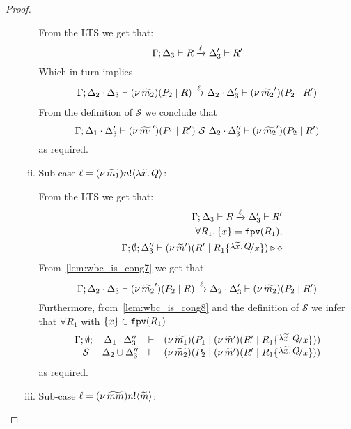 \begin{proof}
\begin{enumerate}
\begin{enumerate}[i.]
							\noi From the LTS we get that:
							\[
								\Gamma; \Delta_3 \vdash R \xrightarrow{\ell} \Delta_3' \vdash R'
							\]
							\noi Which in turn implies
							\begin{eqnarray*}
								\Gamma; \Delta_2 \cdot \Delta_3 \vdash (\nu\, \widetilde{m_2})(P_2 \;|\; R) \xrightarrow{\ell} \Delta_2 \cdot \Delta_3' \vdash (\nu\, \widetilde{m_2}')(P_2 \;|\; R')
							\end{eqnarray*}
							\noi From the definition of $\mathcal{S}$ we conclude that
							\[
								\Gamma; \Delta_1 \cdot \Delta_3' \vdash (\nu\, \widetilde{m_1}')(P_1 \;|\; R') \ \mathcal{S}\  \Delta_2 \cdot \Delta_3'' \vdash (\nu\, \widetilde{m_2}')(P_2 \;|\; R')
							\]
							\noi as required.

				\item	Sub-case $\ell = (\nu\, \widetilde{m_1}) n ! \langle \lambda \widetilde{x}.\,Q \rangle$:

						\noi From the LTS we get that:
						\begin{eqnarray}
							& &	\horel{\Gamma}{\Delta_3}{R}{\by{\ell}}{\Delta_3'}{R'}
								\label{lem:wbc_is_cong7}\\
							& & 	\forall R_1, \set{x} = \fpv{R_1},
								\nonumber\\
							& &	\Gamma; \emptyset; \Delta_3'' \proves \newsp{\widetilde{m}'}{R' \Par R_1 \subst{\abs{\widetilde{x}}{Q}}{x}} \hastype \Proc
								\label{lem:wbc_is_cong8}
						\end{eqnarray}
						\noi From~\eqref{lem:wbc_is_cong7} we get that
						\[
							\Gamma; \Delta_2 \cdot \Delta_3 \vdash (\nu\, \widetilde{m_2}')(P_2 \;|\; R) \xrightarrow{\ell} \Delta_2 \cdot \Delta_3' \vdash (\nu\, \widetilde{m_2})(P_2 \;|\; R')
						\]
						\noi Furthermore, from~\eqref{lem:wbc_is_cong8} and the definition of $\mathcal{S}$ we infer that
						$\forall R_1$ with $\{x\} \in \mathtt{fpv}(R_1)$
						\[
							\mhorel{\Gamma}{\Delta_1 \cat \Delta_3''}{\newsp{\widetilde{m_1}}{P_1 \Par \newsp{\widetilde{m}'}{R' \Par R_1 \subst{\abs{\widetilde{x}}{Q}}{x}}}}
							{\ \mathcal{S}\ }
							{\Delta_2 \cup \Delta_3''}{}{\newsp{\widetilde{m_2}}{P_2 \Par \newsp{\widetilde{m}'}{R' \Par R_1 \subst{\abs{\widetilde{x}}{Q}}{x}}}}
						\]
						\noi as required.

				\item	Sub-case $\ell = (\nu\, \widetilde{mm}) n ! \langle \widetilde{m} \rangle$:


\end{enumerate}
\end{enumerate}
\end{proof}
